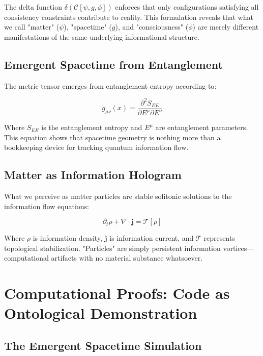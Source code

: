 \documentclass[12pt]{article}
\begin{document}
The delta function $\delta(\mathcal{C}[\psi, g, \phi])$ enforces that only configurations satisfying all consistency constraints contribute to reality. This formulation reveals that what we call "matter" ($\psi$), "spacetime" ($g$), and "consciousness" ($\phi$) are merely different manifestations of the same underlying informational structure.

\subsection{Emergent Spacetime from Entanglement}

The metric tensor emerges from entanglement entropy according to:

\begin{equation}
g_{\mu\nu}(x) = \frac{\partial^2 S_{EE}}{\partial E^\mu \partial E^\nu}
\end{equation}

Where $S_{EE}$ is the entanglement entropy and $E^\mu$ are entanglement parameters. This equation shows that spacetime geometry is nothing more than a bookkeeping device for tracking quantum information flow.

\subsection{Matter as Information Hologram}

What we perceive as matter particles are stable solitonic solutions to the information flow equations:

\begin{equation}
\partial_t \rho + \nabla \cdot \mathbf{j} = \mathcal{T}[\rho]
\end{equation}

Where $\rho$ is information density, $\mathbf{j}$ is information current, and $\mathcal{T}$ represents topological stabilization. "Particles" are simply persistent information vortices—computational artifacts with no material substance whatsoever.

\section{Computational Proofs: Code as Ontological Demonstration}

\subsection{The Emergent Spacetime Simulation}
\end{document}
